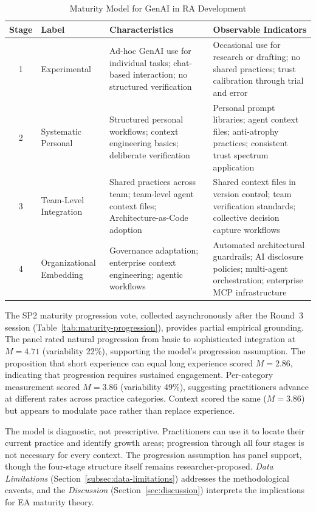 \begin{table}[!ht]
    \centering
    \caption{Maturity Model for GenAI in RA Development}\label{tab:maturity-model}
    \begin{tabular}{|c|p{3cm}|p{4.5cm}|p{4.5cm}|}
        \hline
        \textbf{Stage} & \textbf{Label} & \textbf{Characteristics} & \textbf{Observable Indicators} \\
        \hline
        1 & Experimental & Ad-hoc GenAI use for individual tasks; chat-based interaction; no structured verification & Occasional use for research or drafting; no shared practices; trust calibration through trial and error \\
        \hline
        2 & Systematic Personal & Structured personal workflows; context engineering basics; deliberate verification & Personal prompt libraries; agent context files; anti-atrophy practices; consistent trust spectrum application \\
        \hline
        3 & Team-Level Integration & Shared practices across team; team-level agent context files; Architecture-as-Code adoption & Shared context files in version control; team verification standards; collective decision capture workflows \\
        \hline
        4 & Organizational Embedding & Governance adaptation; enterprise context engineering; agentic workflows & Automated architectural guardrails; AI disclosure policies; multi-agent orchestration; enterprise MCP infrastructure \\
        \hline
    \end{tabular}
\end{table}

The SP2 maturity progression vote, collected asynchronously after the Round~3
session (Table~\ref{tab:maturity-progression}), provides partial empirical
grounding. The panel rated natural progression from basic to sophisticated
integration at $M = 4.71$ (variability 22\%), supporting the model's
progression assumption. The proposition that short experience can equal long
experience scored $M = 2.86$, indicating that progression requires sustained
engagement. Per-category measurement scored $M = 3.86$ (variability 49\%),
suggesting practitioners advance at different rates across practice categories.
Context scored the same ($M = 3.86$) but appears to modulate pace rather than
replace experience.

The model is diagnostic, not prescriptive. Practitioners can use it to locate
their current practice and identify growth areas; progression through all four
stages is not necessary for every context. The progression assumption has
panel support, though the four-stage structure itself remains
researcher-proposed. \textit{Data Limitations} (Section~\ref{subsec:data-limitations}) addresses the
methodological caveats, and the \textit{Discussion} (Section~\ref{sec:discussion}) interprets the
implications for EA maturity theory.

